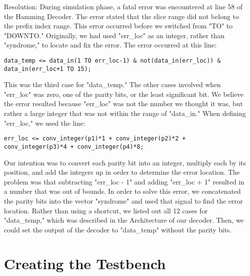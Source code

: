 \documentclass[paper=letter, fontsize=11pt]{scrartcl}
\numberwithin{equation}{section} %
\numberwithin{figure}{section} %
\numberwithin{table}{section} %
\begin{document}
Resolution: During simulation phase, a fatal error was encountered at line 58 of the Hamming Decoder. The error stated that the slice range did not belong to the prefix index range. This error occurred before we switched from "TO" to "DOWNTO." Originally, we had used "err\_loc" as an integer, rather than "syndrome," to locate and fix the error. The error occurred at this line: 
\begin{verbatim}
data_temp <= data_in(1 TO err_loc-1) & not(data_in(err_loc)) & data_in(err_loc+1 TO 15);
\end{verbatim}
This was the third case for "data\_temp." The other cases involved when "err\_loc" was zero, one of the parity bits, or the least significant bit. We believe the error resulted because "err\_loc" was not the number we thought it was, but rather a large integer that was not within the range of "data\_in." When defining "err\_loc," we used the line:
\begin{verbatim}
err_loc <= conv_integer(p1)*1 + conv_integer(p2)*2 + conv_integer(p3)*4 + conv_integer(p4)*8;
\end{verbatim}
Our intention was to convert each parity bit into an integer, multiply each by its position, and add the integers up in order to determine the error location. The problem was that subtracting "err\_loc - 1" and adding "err\_loc + 1" resulted in a number that was out of bounds. In order to solve this error, we concatenated the parity bits into the vector "syndrome" and used that signal to find the error location. Rather than using a shortcut, we listed out all 12 cases for "data\_temp," which was described in the Architecture of our decoder. Then, we could set the output of the decoder to "data\_temp" without the parity bits.\\[20pt] 

\section{Creating the Testbench}
\end{document}
